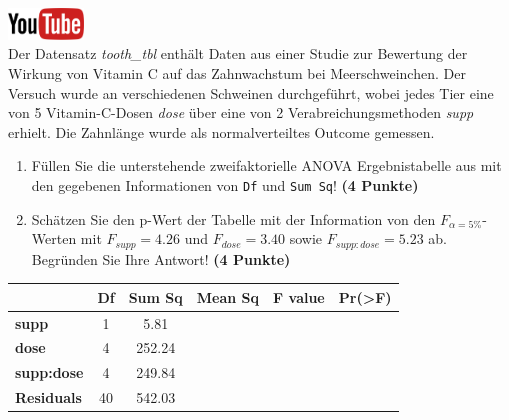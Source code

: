 \documentclass[a4paper, 10pt]{scrartcl}\usepackage[]{graphicx}\usepackage[]{xcolor}
\begin{document}
\hfill\href{https://youtu.be/8Pb2sKUIMyk}{\includegraphics[width =
  2cm]{img/youtube}}\\[1Ex]



Der Datensatz \textit{tooth\_tbl} enth{\"a}lt Daten aus einer Studie zur
Bewertung der Wirkung von Vitamin C auf das Zahnwachstum bei
Meerschweinchen. Der Versuch wurde an verschiedenen Schweinen durchgef{\"u}hrt,
wobei jedes Tier eine von 5 Vitamin-C-Dosen \textit{dose}
{\"u}ber eine von 2 Verabreichungsmethoden \textit{supp}
erhielt. Die Zahnl{\"a}nge wurde als normalverteiltes Outcome gemessen.



\begin{enumerate}
\item F{\"u}llen Sie die unterstehende zweifaktorielle ANOVA Ergebnistabelle aus
  mit den gegebenen Informationen von \texttt{Df} und \texttt{Sum Sq}!
  \textbf{(4 Punkte)}
\item Sch{\"a}tzen Sie den p-Wert der Tabelle mit der Information von den
  $F_{\alpha = 5\%}$-Werten mit
  $F_{supp} = 4.26$ und
  $F_{dose} = 3.40$ sowie
  $F_{supp:dose} = 5.23$ ab. Begr{\"u}nden Sie Ihre
  Antwort! \textbf{(4 Punkte)}
\end{enumerate}

\vspace{1Ex}

\begin{center}
  \Large
  \begin{tabular}{l|c|c|c|c|c}
     & \textbf{Df} & \textbf{Sum Sq} & \textbf{Mean Sq} & \textbf{F value} & \textbf{Pr(>F)} \strut\\
    \hline
   \textbf{supp}  & 1 & 5.81 &  &  &  \strut\\
    \hline
    \textbf{dose}  & 4 & 252.24 &  &  &  \strut\\
    \hline
    \textbf{supp:dose}  & 4 & 249.84 &  &  &  \strut\\
    \hline
   \textbf{Residuals}  & 40 & 542.03 &  &  &  \strut\\
  \end{tabular}
\end{center}

\vspace{1Ex}
\end{document}
